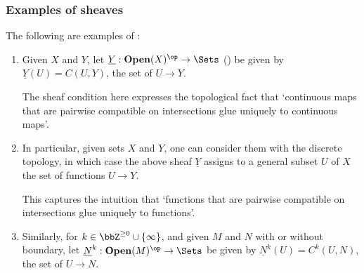 






\subsubsection{Examples of sheaves}

\begin{example}
    The following are examples of :
    \begin{enumerate}
        \item Given  $X$ and $Y$, let $\underline{Y}: \mathbf{Open}(X)^{\op} \to \Sets$ () be given by $\underline{Y}(U) = C(U,Y)$, the set of  $U \to Y$. 

        The sheaf condition here expresses the topological fact that `continuous maps that are pairwise compatible on intersections glue uniquely to continuous maps'.

        \item In particular, given sets $X$ and $Y$, one can consider them with the discrete topology, in which case the above sheaf $\underline{Y}$ assigns to a general subset $U$ of $X$ the set of functions $U \to Y$. 

        This captures the intuition that `functions that are pairwise compatible on intersections glue uniquely to functions'.

        \item Similarly, for $k \in \bbZ^{\geq 0} \cup \{\infty\}$, and given  $M$ and $N$ with or without boundary, let $\underline{N}^k: \mathbf{Open}(M)^{\op} \to \Sets$ be given by $\underline{N}^k(U) = C^k(U, N)$, the set of  $U \to N$.


\end{enumerate}
\end{example}
